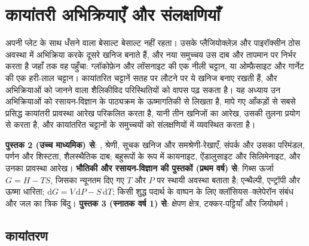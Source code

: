 \chapter{कायांतरी अभिक्रियाएँ और संलक्षणियाँ}\label{ch:b2:metamorphic-facies}

अपनी प्लेट के साथ धँसने वाला बेसाल्ट बेसाल्ट नहीं रहता। उसके प्लैजियोक्लेज़ और पाइरॉक्सीन
ठोस अवस्था में अभिक्रिया करके दूसरे खनिज बनाते हैं, और नया समुच्चय उस
दाब और तापमान पर निर्भर करता है जहाँ तक वह पहुँचा: ग्लॉकोफ़ेन और लॉसनाइट की एक नीली चट्टान, या
ओम्फ़ैसाइट और गार्नेट की एक हरी-लाल चट्टान। कायांतरित चट्टानें सतह पर लौटने पर ये खनिज
बनाए रखती हैं, और अभिक्रियाओं को जानने वाला शैलिकीविद
परिस्थितियों को वापस पढ़ सकता है। यह अध्याय उन अभिक्रियाओं को रसायन-विज्ञान के पाठ्यक्रम के
ऊष्मागतिकी से लिखता है, मापे गए आँकड़ों से सबसे प्रसिद्ध कायांतरी प्रावस्था आरेख परिकलित करता है,
यानी तीन  खनिजों का आरेख, उसकी तुलना प्रयोग से करता है, और
कायांतरित चट्टानों के समुच्चयों को संलक्षणियों में व्यवस्थित करता है।

\begin{recall}
\textbf{पुस्तक 2 (उच्च माध्यमिक) से}: ,  श्रेणी, सूचक खनिज
और समश्रेणी-रेखाएँ, संपर्क  और उसका परिमंडल, पर्णन और शिस्टता,
शैलस्थैतिक दाब; बहुरूपों के रूप में कायनाइट, ऐंडालुसाइट और सिलिमेनाइट, और उनका
प्रावस्था आरेख। \textbf{भौतिकी और रसायन-विज्ञान की पुस्तकों (प्रथम वर्ष) से}: गिब्स
ऊर्जा $G = H - TS$, जिसका न्यूनतम दिए गए $T$ और $P$ पर स्थायी अवस्था बताता है;
एन्थैल्पी, एन्ट्रॉपी और ऊष्मा धारिता; $\mathrm dG = V\,\mathrm dP - S\,\mathrm dT$; किसी शुद्ध पदार्थ के
वाष्पन के लिए क्लॉसियस--क्लेपेरॉन संबंध और जल का त्रिक
बिंदु। \textbf{पुस्तक 3 (स्नातक वर्ष 1) से}: क्षेपण क्षेत्र, टक्कर-पट्टियाँ और
जियोथर्म।
\end{recall}

\section{कायांतरण}\label{sec:b2:metamorphic-facies:metamorphism}

